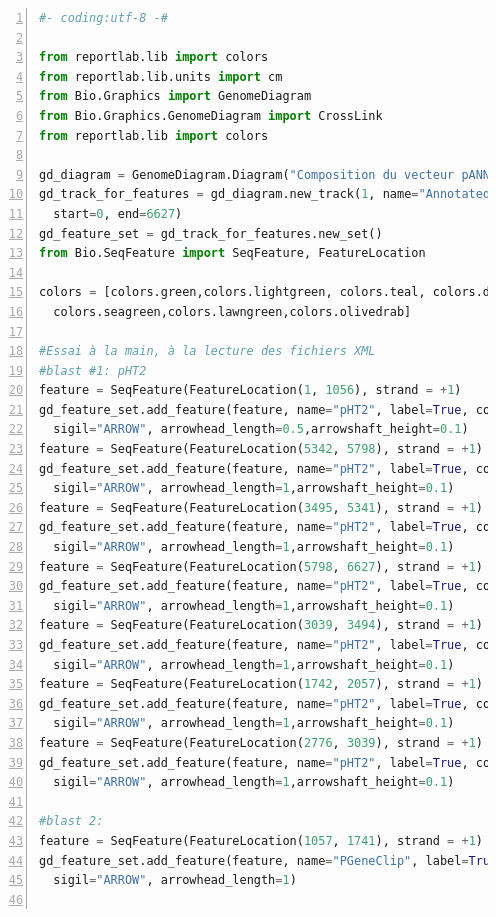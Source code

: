 \documentclass[10.9pt]{article} %
\begin{document}
\begin{lstlisting}[frame=single,numbers=left,language=Python]
#- coding:utf-8 -#

from reportlab.lib import colors
from reportlab.lib.units import cm
from Bio.Graphics import GenomeDiagram
from Bio.Graphics.GenomeDiagram import CrossLink
from reportlab.lib import colors

gd_diagram = GenomeDiagram.Diagram("Composition du vecteur pANNE.txt")
gd_track_for_features = gd_diagram.new_track(1, name="Annotated Features", 
  start=0, end=6627)
gd_feature_set = gd_track_for_features.new_set()
from Bio.SeqFeature import SeqFeature, FeatureLocation

colors = [colors.green,colors.lightgreen, colors.teal, colors.darkgreen,
  colors.seagreen,colors.lawngreen,colors.olivedrab]

#Essai à la main, à la lecture des fichiers XML
#blast #1: pHT2
feature = SeqFeature(FeatureLocation(1, 1056), strand = +1)
gd_feature_set.add_feature(feature, name="pHT2", label=True, color=colors[0],
  sigil="ARROW", arrowhead_length=0.5,arrowshaft_height=0.1)
feature = SeqFeature(FeatureLocation(5342, 5798), strand = +1)
gd_feature_set.add_feature(feature, name="pHT2", label=True, color=colors[1], 
  sigil="ARROW", arrowhead_length=1,arrowshaft_height=0.1)
feature = SeqFeature(FeatureLocation(3495, 5341), strand = +1)
gd_feature_set.add_feature(feature, name="pHT2", label=True, color=colors[2], 
  sigil="ARROW", arrowhead_length=1,arrowshaft_height=0.1)
feature = SeqFeature(FeatureLocation(5798, 6627), strand = +1)
gd_feature_set.add_feature(feature, name="pHT2", label=True, color=colors[3], 
  sigil="ARROW", arrowhead_length=1,arrowshaft_height=0.1)
feature = SeqFeature(FeatureLocation(3039, 3494), strand = +1)
gd_feature_set.add_feature(feature, name="pHT2", label=True, color=colors[4], 
  sigil="ARROW", arrowhead_length=1,arrowshaft_height=0.1)
feature = SeqFeature(FeatureLocation(1742, 2057), strand = +1)
gd_feature_set.add_feature(feature, name="pHT2", label=True, color=colors[5], 
  sigil="ARROW", arrowhead_length=1,arrowshaft_height=0.1)
feature = SeqFeature(FeatureLocation(2776, 3039), strand = +1)
gd_feature_set.add_feature(feature, name="pHT2", label=True, color=colors[6], 
  sigil="ARROW", arrowhead_length=1,arrowshaft_height=0.1)

#blast 2:
feature = SeqFeature(FeatureLocation(1057, 1741), strand = +1)
gd_feature_set.add_feature(feature, name="PGeneClip", label=True, color="blue", 
  sigil="ARROW", arrowhead_length=1)


\end{lstlisting}
\end{document}
